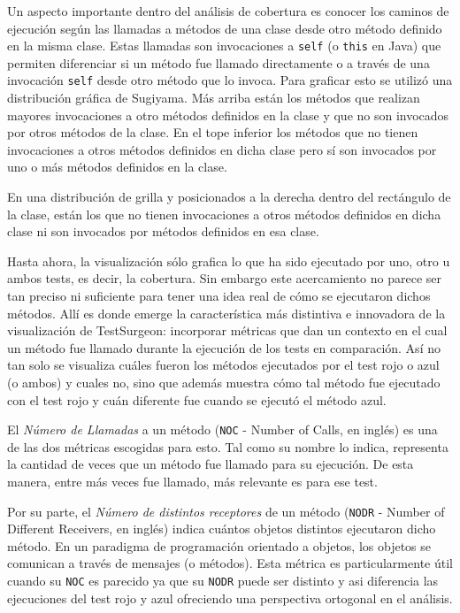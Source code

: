 \par Un aspecto importante dentro del análisis de cobertura es conocer los caminos de ejecución según las llamadas a métodos de una clase desde otro método definido en la misma clase. Estas llamadas son invocaciones a {\tt self} (o {\tt this} en Java) que permiten diferenciar si un método fue llamado directamente o a través de una invocación {\tt self} desde otro método que lo invoca. Para graficar esto se utilizó una distribución gráfica de Sugiyama. Más arriba están los métodos que realizan mayores invocaciones a otro métodos definidos en la clase y que no son invocados por otros métodos de la clase. En el tope inferior los métodos que no tienen invocaciones a otros métodos definidos en dicha clase pero sí son invocados por uno o más métodos definidos en la clase.

\par En una distribución de grilla y posicionados a la derecha dentro del rectángulo de la clase, están los que no tienen invocaciones a otros métodos definidos en dicha clase ni son invocados por métodos definidos en esa clase.

\par Hasta ahora, la visualización sólo grafica lo que ha sido ejecutado por uno, otro u ambos tests, es decir, la cobertura. Sin embargo este acercamiento no parece ser tan preciso ni suficiente para tener una idea real de cómo se ejecutaron dichos métodos. Allí es donde emerge la característica más distintiva e innovadora de la visualización de TestSurgeon: incorporar métricas que dan un contexto en el cual un método fue llamado durante la ejecución de los tests en comparación. Así no tan solo se visualiza cuáles fueron los métodos ejecutados por el test rojo o azul (o ambos) y cuales no, sino que además muestra cómo tal método fue ejecutado con el test rojo y cuán diferente fue cuando se ejecutó el método azul.

\par El \emph{Número de Llamadas} a un método ({\tt NOC} - Number of Calls, en inglés) es una de las dos métricas escogidas para esto. Tal como su nombre lo indica, representa la cantidad de veces que un método fue llamado para su ejecución. De esta manera, entre más veces fue llamado, más relevante es para ese test.

\par Por su parte, el \emph{Número de distintos receptores} de un método ({\tt NODR} - Number of Different Receivers, en inglés) indica cuántos objetos distintos ejecutaron dicho método. En un paradigma de programación orientado a objetos, los objetos se comunican a través de mensajes (o métodos). Esta métrica es particularmente útil cuando su {\tt NOC} es parecido ya que su {\tt NODR} puede ser distinto y asi diferencia las ejecuciones del test rojo y azul ofreciendo una perspectiva ortogonal en el análisis.

